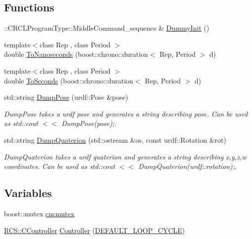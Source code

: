 \subsection*{Functions}
\begin{DoxyCompactItemize}
\item 
\-::C\-R\-C\-L\-Program\-Type\-::\-Middle\-Command\-\_\-sequence \& \hyperlink{namespaceRCS_a0d81b5ae27814995884c1d25619db28a}{Dummy\-Init} ()
\item 
{\footnotesize template$<$class Rep , class Period $>$ }\\double \hyperlink{namespaceRCS_a1d588bfecc6b5d8e671ad9c57d18ecdc}{To\-Nanoseconds} (boost\-::chrono\-::duration$<$ Rep, Period $>$ d)
\item 
{\footnotesize template$<$class Rep , class Period $>$ }\\double \hyperlink{namespaceRCS_a82f7cfa7edd613a454281ce5f5685b4d}{To\-Seconds} (boost\-::chrono\-::duration$<$ Rep, Period $>$ d)
\item 
std\-::string \hyperlink{namespaceRCS_ac45b18edecf0b0f60b08ca409cbe477a}{Dump\-Pose} (urdf\-::\-Pose \&pose)
\begin{DoxyCompactList}\small\item\em Dump\-Pose takes a urdf pose and generates a string describing pose. Can be used as std\-::cout $<$$<$ Dump\-Pose(pose);. \end{DoxyCompactList}\item 
std\-::string \hyperlink{namespaceRCS_ac04aacea4f1ce25e58ed402586b8ae14}{Dump\-Quaterion} (std\-::ostream \&os, const urdf\-::\-Rotation \&rot)
\begin{DoxyCompactList}\small\item\em Dump\-Quaterion takes a urdf quaterion and generates a string describing x,y,z,w coordinates. Can be used as std\-::cout $<$$<$ Dump\-Quaterion(urdf\-::rotation);. \end{DoxyCompactList}\end{DoxyCompactItemize}
\subsection*{Variables}
\begin{DoxyCompactItemize}
\item 
boost\-::mutex \hyperlink{namespaceRCS_a021572a9d03c82d96029e82ea5691d60}{cncmutex}
\item 
\hyperlink{structRCS_1_1CController}{R\-C\-S\-::\-C\-Controller} \hyperlink{namespaceRCS_a9d517dc59f249be605546c3a36086b19}{Controller} (\hyperlink{RCS_8h_a226eb3a426e9df46b88c4ba34f217203}{D\-E\-F\-A\-U\-L\-T\-\_\-\-L\-O\-O\-P\-\_\-\-C\-Y\-C\-L\-E})
\end{DoxyCompactItemize}


